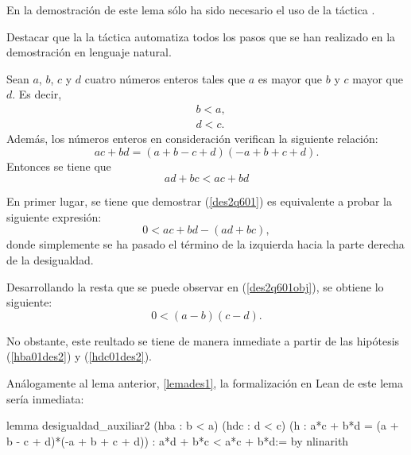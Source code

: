 En la demostración de este lema sólo ha sido necesario el uso de la
táctica .

Destacar que la la táctica  automatiza todos
los pasos que se han realizado en la demostración en lenguaje natural.

\begin{lema}\label{lemades2}
  Sean \(a\), \(b\), \(c\) y \(d\) cuatro números enteros tales que \(a\) es
  mayor que \(b\) y \(c\) mayor que \(d\). Es decir,
  \begin{align}
    &b<a,\tag{hba}\label{hba01des2}\\
    &d<c.\tag{hdc}\label{hdc01des2}
  \end{align}
  Además, los números enteros en consideración verifican la siguiente relación:
    \begin{equation}\tag{h}
      ac+bd = (a+b-c+d)(-a+b+c+d).
    \end{equation}
    Entonces se tiene que
    \begin{equation}\label{des2q601}
      ad+bc < ac+bd
    \end{equation}
\end{lema}

\begin{demostracion}
  En primer lugar, se tiene que demostrar (\ref{des2q601}) es equivalente a
  probar la siguiente expresión:
  \begin{equation}\label{des2q601obj}
      0<ac+bd-(ad+bc),
  \end{equation}
  donde simplemente se ha pasado el término de la izquierda hacia la parte
  derecha de la desigualdad.

  Desarrollando la resta que se puede observar en (\ref{des2q601obj}), se
  obtiene lo siguiente:
  \begin{equation}
    0<(a-b)(c-d).
  \end{equation}

  No obstante, este reultado se tiene de manera inmediate a partir de las
  hipótesis (\ref{hba01des2}) y (\ref{hdc01des2}).
\end{demostracion}

Análogamente al lema anterior, \ref{lemades1}, la formalización en Lean de
este lema sería inmediata:
\begin{leancode}
lemma desigualdad_auxiliar2
  (hba : b < a)
  (hdc : d < c)
  (h : a*c + b*d = (a + b - c + d)*(-a + b + c + d))
  : a*d + b*c < a*c + b*d:=
by nlinarith
\end{leancode}


